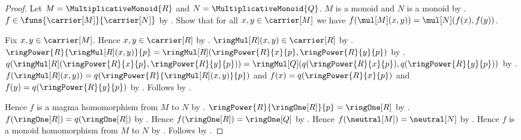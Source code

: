 \begin{proof}
    Let $M=\MultiplicativeMonoid{R}$ and
        $N=\MultiplicativeMonoid{Q}$.
    $M$ is a monoid and $N$ is a monoid by
        .
    $f\in\funs{\carrier[M]}{\carrier[N]}$ by
        .
    Show that for all $x,y\in\carrier[M]$ we have
        $f(\mul[M](x,y))=\mul[N](f(x),f(y))$.
    \begin{subproof}
        Fix $x,y\in\carrier[M]$.
        Hence $x,y\in\carrier[R]$ by
            .
        $\ringMul[R](x,y)\in\carrier[R]$ by .
        $\ringPower{R}{\ringMul[R](x,y)}{p}
            =\ringMul[R](\ringPower{R}{x}{p},
                \ringPower{R}{y}{p})$ by
            .
        $q(\ringMul[R](\ringPower{R}{x}{p},
                \ringPower{R}{y}{p}))
            =\ringMul[Q](q(\ringPower{R}{x}{p}),
                q(\ringPower{R}{y}{p}))$ by
            .
        $f(\ringMul[R](x,y))
            =q(\ringPower{R}{\ringMul[R](x,y)}{p})$ and
            $f(x)=q(\ringPower{R}{x}{p})$ and
            $f(y)=q(\ringPower{R}{y}{p})$ by
            .
        Follows by .
    \end{subproof}
    Hence $f$ is a magma homomorphism from $M$ to $N$ by
        .
    $\ringPower{R}{\ringOne[R]}{p}=\ringOne[R]$ by
        .
    $f(\ringOne[R])=q(\ringOne[R])$ by
        .
    Hence $f(\ringOne[R])=\ringOne[Q]$ by
        .
    Hence $f(\neutral[M])=\neutral[N]$ by
        .
    Hence $f$ is a monoid homomorphism from $M$ to $N$ by
        .
    Follows by .
\end{proof}

